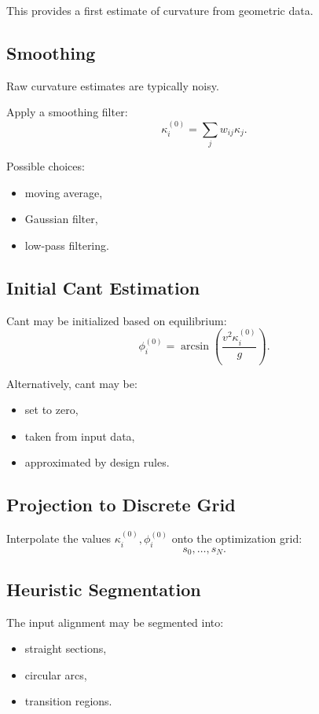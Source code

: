 This provides a first estimate of curvature from geometric data.

\subsection{Smoothing}

Raw curvature estimates are typically noisy.

\begin{definition}
Apply a smoothing filter:
\[
\kappa_i^{(0)}
=
\sum_j w_{ij} \kappa_j.
\]
\end{definition}

Possible choices:
\begin{itemize}
\item moving average,
\item Gaussian filter,
\item low-pass filtering.
\end{itemize}

\subsection{Initial Cant Estimation}

Cant may be initialized based on equilibrium:
\[
\phi_i^{(0)}
=
\arcsin\left(\frac{v^2 \kappa_i^{(0)}}{g}\right).
\]

Alternatively, cant may be:
\begin{itemize}
\item set to zero,
\item taken from input data,
\item approximated by design rules.
\end{itemize}

\subsection{Projection to Discrete Grid}

\begin{definition}
Interpolate the values \(\kappa_i^{(0)},\phi_i^{(0)}\)
onto the optimization grid:
\[
s_0,\dots,s_N.
\]
\end{definition}

\subsection{Heuristic Segmentation}

The input alignment may be segmented into:
\begin{itemize}
\item straight sections,
\item circular arcs,
\item transition regions.
\end{itemize}

